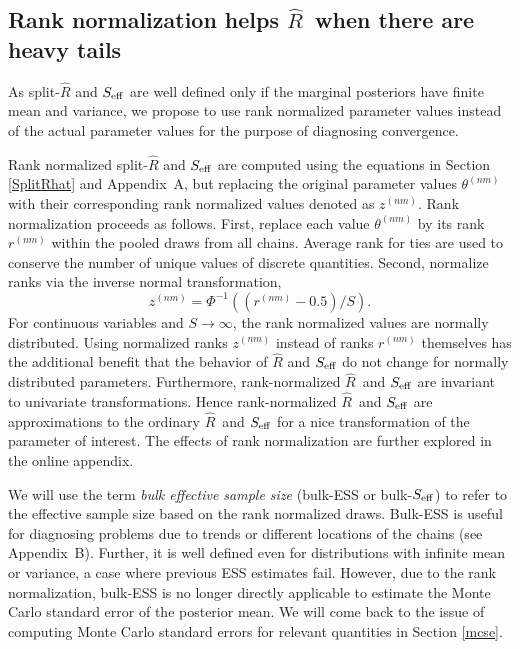\documentclass[american,]{article}
\newcommand{\Rhat}{$\widehat{R}$}
\theoremstyle{definition}
\begin{document}
\hypertarget{rank-normalization}{%
\subsection{Rank normalization helps  \Rhat\ when there are heavy tails}\label{rank-normalization}}

As split-\(\widehat{R}\) and \(S_{\rm eff}\) are well defined
only if the marginal posteriors have finite mean and variance, we
propose to use rank normalized parameter values instead of the actual
parameter values for the purpose of diagnosing convergence.

Rank normalized split-\(\widehat{R}\) and \(S_{\rm eff}\) are
computed using the equations in Section \ref{SplitRhat} and Appendix~A, but
replacing the original parameter values \(\theta^{(nm)}\) with their
corresponding rank normalized values denoted as \(z^{(nm)}\). Rank
normalization proceeds as follows.  First, replace each value
\(\theta^{(nm)}\) by its rank \(r^{(nm)}\) within the pooled draws
from all chains.  Average rank for ties are used to conserve the
number of unique values of discrete quantities.  Second, normalize
ranks via the inverse normal transformation,
\begin{equation}
z^{(nm)} = \Phi^{-1}((r^{(nm)}-0.5)/S).
\end{equation}
For continuous variables and \(S \rightarrow \infty\), the rank
normalized values are normally distributed. Using normalized ranks
\(z^{(nm)}\) instead of ranks \(r^{(nm)}\) themselves has the additional
benefit that the behavior of \(\widehat{R}\) and \(S_{\rm eff}\) do
not change for normally distributed parameters.  Furthermore, rank-normalized \Rhat\ and \(S_{\rm eff}\) are invariant to univariate transformations. Hence    
rank-normalized \Rhat\ and \(S_{\rm eff}\) are approximations to the ordinary \Rhat\ and \(S_{\rm eff}\) for a nice transformation of the parameter of interest.
The effects of rank normalization are further explored in the online appendix.

We will use the term \emph{bulk effective sample size} (bulk-ESS or
bulk-\(S_{\rm eff}\)) to refer to the effective sample size based on the
rank normalized draws. Bulk-ESS is useful for diagnosing problems due to
trends or different locations of the chains (see Appendix~B). Further, it is
well defined even for distributions with infinite mean or variance, a
case where previous ESS estimates fail. However, due to the rank
normalization, bulk-ESS is no longer directly applicable to estimate the
Monte Carlo standard error of the posterior mean. We will come back to
the issue of computing Monte Carlo standard errors for relevant
quantities in Section \ref{mcse}.
\end{document}
